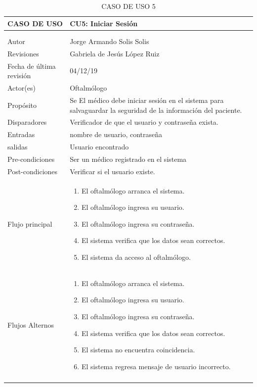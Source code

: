 \documentclass[10pt]{article}
\begin{document}
\begin{longtable}{|p{3.8cm}|p{10.8cm}|}
\hline
CASO DE USO & CU5: Iniciar Sesión\\
\hline 
\endfirsthead

\hline

 & \\
\hline 
\endhead

\multicolumn{2}{c}{}
\endfoot

\endlastfoot
\hline
versión & 1\\
\hline
Autor & Jorge Armando Solis Solis\\
\hline
Revisiones & Gabriela de Jesús López Ruiz \\
\hline
Fecha de última revisión & 04/12/19\\
\hline
Actor(es) & Oftalmólogo \\
\hline
Propósito & Se El médico debe iniciar sesión en el sistema para salvaguardar la seguridad de la información del paciente.\\
\hline
Disparadores & Verificador de que el usuario y contraseña exista.\\
\hline
Entradas & nombre de usuario, contraseña\\
\hline
salidas & Usuario encontrado\\
\hline
Pre-condiciones & Ser un médico registrado en el sistema\\
\hline
Post-condiciones & Verificar si el usuario existe. \\
\hline
Flujo principal & \begin{enumerate}
    \item El oftalmólogo arranca el sistema.
    \item El oftalmólogo ingresa su usuario.
    \item El oftalmólogo ingresa su contraseña.
    \item El sistema verifica que los datos sean correctos.
    \item El sistema da acceso al oftalmólogo.
\end{enumerate}
    \\
\hline
Flujos Alternos & \begin{enumerate}
    \item El oftalmólogo arranca el sistema.
    \item El oftalmólogo ingresa su usuario.
    \item El oftalmólogo ingresa su contraseña.
    \item El sistema verifica que los datos sean correctos.
    \item El sistema no encuentra coincidencia.
    \item El sistema regresa mensaje de usuario incorrecto.
\end{enumerate}\\
\hline
\caption{CASO DE USO 5}
\label{tabla1}
\end{longtable}
\end{document}
